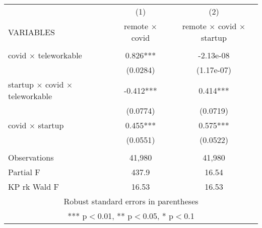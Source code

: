 \begin{tabular}{lcc} \hline
 & (1) & (2) \\
VARIABLES & remote $\times$ covid & remote $\times$ covid $\times$ startup \\ \hline
 &  &  \\
covid $\times$ teleworkable & 0.826*** & -2.13e-08 \\
 & (0.0284) & (1.17e-07) \\
startup $\times$ covid $\times$ teleworkable & -0.412*** & 0.414*** \\
 & (0.0774) & (0.0719) \\
covid $\times$ startup & 0.455*** & 0.575*** \\
 & (0.0551) & (0.0522) \\
 &  &  \\
Observations & 41,980 & 41,980 \\
Partial F & 437.9 & 16.54 \\
 KP rk Wald F & 16.53 & 16.53 \\ \hline
\multicolumn{3}{c}{ Robust standard errors in parentheses} \\
\multicolumn{3}{c}{ *** p$<$0.01, ** p$<$0.05, * p$<$0.1} \\
\end{tabular}
